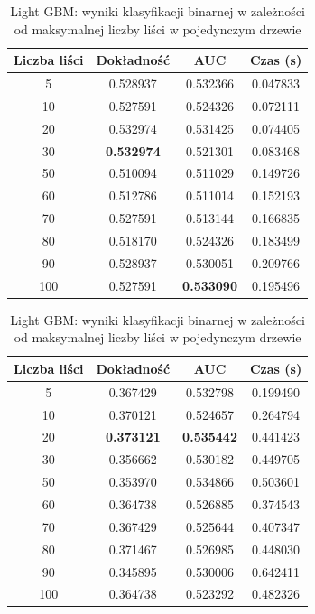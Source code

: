 \documentclass[a4paper, twoside, 11pt, openright]{article}
\begin{document}
\begin{table}[H]
    \centering
    \begin{tabular}{|c|c|c|c|}
    \hline
        \textbf{Liczba liści} & \textbf{Dokładność} & \textbf{AUC} & \textbf{Czas (s)} \\ \hline
5        &  0.528937 &  0.532366 &    0.047833 \\ \hline
10       &  0.527591 &  0.524326 &    0.072111 \\ \hline
20       &  0.532974 &  0.531425 &    0.074405 \\ \hline
30       &  \textbf{0.532974} &  0.521301 &    0.083468 \\ \hline
50       &  0.510094 &  0.511029 &    0.149726 \\ \hline
60       &  0.512786 &  0.511014 &    0.152193 \\ \hline
70       &  0.527591 &  0.513144 &    0.166835 \\ \hline
80       &  0.518170 &  0.524326 &    0.183499 \\ \hline
90       &  0.528937 &  0.530051 &    0.209766 \\ \hline
100      &  0.527591 &  \textbf{0.533090} &    0.195496 \\ \hline
    \end{tabular}
    \caption{Light GBM: wyniki klasyfikacji binarnej w zależności od maksymalnej liczby liści w pojedynczym drzewie}
    \label{tab:lgbm_num_leaves_binary}
\end{table}

\begin{table}[H]
    \centering
    \begin{tabular}{|c|c|c|c|}
    \hline
        \textbf{Liczba liści} & \textbf{Dokładność} & \textbf{AUC} & \textbf{Czas (s)} \\ \hline
5        &  0.367429 &  0.532798 &    0.199490 \\ \hline
10       &  0.370121 &  0.524657 &    0.264794 \\ \hline
20       &  \textbf{0.373121} &  \textbf{0.535442} &    0.441423 \\ \hline
30       &  0.356662 &  0.530182 &    0.449705 \\ \hline
50       &  0.353970 &  0.534866 &    0.503601 \\ \hline
60       &  0.364738 &  0.526885 &    0.374543 \\ \hline
70       &  0.367429 &  0.525644 &    0.407347 \\ \hline
80       &  0.371467 &  0.526985 &    0.448030 \\ \hline
90       &  0.345895 &  0.530006 &    0.642411 \\ \hline
100      &  0.364738 &  0.523292 &    0.482326 \\ \hline

    \end{tabular}
    \caption{Light GBM: wyniki klasyfikacji binarnej w zależności od maksymalnej liczby liści w pojedynczym drzewie}
    \label{tab:lgbm_num_leaves_discrete}
\end{table}
\end{document}
